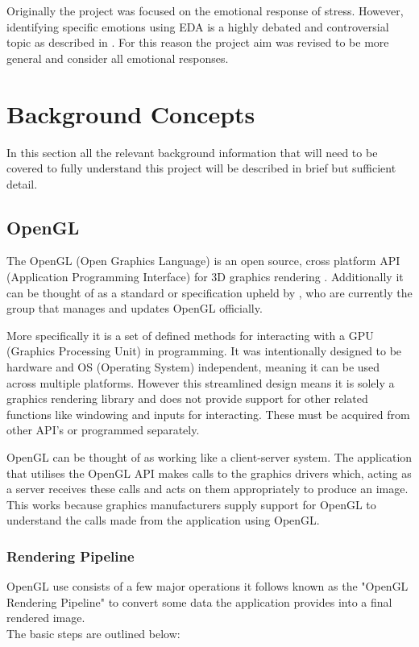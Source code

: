 \documentclass{report}
\begin{document}
Originally the project was focused on the emotional response of stress. However, identifying specific emotions using EDA is a highly debated and controversial 
topic as described in \citep{duffy1972handbook}. For this reason the project aim was revised to be more general and consider all emotional responses.

\chapter{Background Concepts}

In this section all the relevant background information that will need to be covered to fully understand this project will be described in brief but sufficient detail.

\section{OpenGL}

The OpenGL (Open Graphics Language) is an open source, cross platform API (Application Programming Interface) for 3D graphics rendering \citep{woo1999opengl}. Additionally it can be thought of as a standard or specification upheld by \citep{KhronosGrouP}, who are currently the group that manages and updates OpenGL officially.

More specifically it is a set of defined methods for interacting with a GPU (Graphics Processing Unit) in programming. It was intentionally designed to be hardware and OS (Operating System) independent, meaning it can be used across multiple platforms. However this streamlined design means it is solely a graphics rendering library and does not provide support for other related functions like windowing and inputs for interacting. These must be acquired from other API's or programmed separately.

OpenGL can be thought of as working like a client-server system. The application that utilises the OpenGL API makes calls to the graphics drivers which, acting as a server receives these calls and acts on them appropriately to produce an image. This works because graphics manufacturers supply support for OpenGL to understand the calls made from the application using OpenGL.

\subsection{Rendering Pipeline}

OpenGL use consists of a few major operations it follows known as the "OpenGL Rendering Pipeline" to convert some data the application provides into a final rendered image.\\
The basic steps are outlined below:
\end{document}
